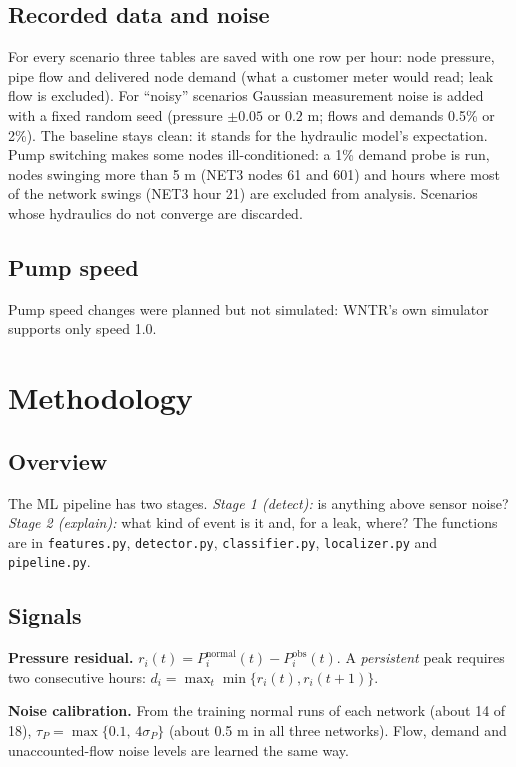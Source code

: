 \documentclass[11pt,a4paper]{article}
\newcommand{\code}[1]{\texttt{#1}}
\begin{document}
\subsection{Recorded data and noise}
For every scenario three tables are saved with one row per hour: node pressure, pipe flow and delivered node demand (what a customer meter would read; leak flow is excluded). For ``noisy'' scenarios Gaussian measurement noise is added with a fixed random seed (pressure $\pm0.05$ or $0.2$ m; flows and demands 0.5\% or 2\%). The baseline stays clean: it stands for the hydraulic model's expectation. Pump switching makes some nodes ill-conditioned: a 1\% demand probe is run, nodes swinging more than 5 m (NET3 nodes 61 and 601) and hours where most of the network swings (NET3 hour 21) are excluded from analysis. Scenarios whose hydraulics do not converge are discarded.

\subsection{Pump speed}
Pump speed changes were planned but not simulated: WNTR's own simulator supports only speed 1.0.

\section{Methodology}
\subsection{Overview}
The ML pipeline has two stages. \emph{Stage 1 (detect):} is anything above sensor noise? \emph{Stage 2 (explain):} what kind of event is it and, for a leak, where? The functions are in \code{features.py}, \code{detector.py}, \code{classifier.py}, \code{localizer.py} and \code{pipeline.py}.

\subsection{Signals}
\textbf{Pressure residual.} $r_i(t)=P^{\text{normal}}_i(t)-P^{\text{obs}}_i(t)$. A \emph{persistent} peak requires two consecutive hours: $d_i=\max_t\min\{r_i(t),r_i(t{+}1)\}$.

\textbf{Noise calibration.} From the training normal runs of each network (about 14 of 18), $\tau_P=\max\{0.1,\,4\sigma_P\}$ (about 0.5 m in all three networks). Flow, demand and unaccounted-flow noise levels are learned the same way.
\end{document}
